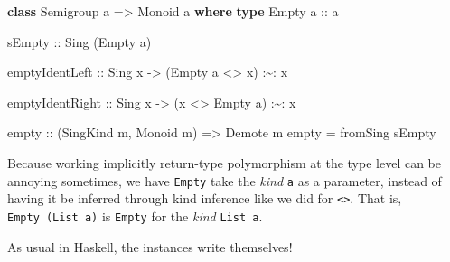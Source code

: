 \documentclass[]{article}
\newenvironment{Shaded}{}{}
\newcommand{\DataTypeTok}[1]{\textcolor[rgb]{0.56,0.13,0.00}{#1}}
\newcommand{\KeywordTok}[1]{\textcolor[rgb]{0.00,0.44,0.13}{\textbf{#1}}}
\newcommand{\NormalTok}[1]{#1}
\newcommand{\OperatorTok}[1]{\textcolor[rgb]{0.40,0.40,0.40}{#1}}
\newcommand{\OtherTok}[1]{\textcolor[rgb]{0.00,0.44,0.13}{#1}}
\begin{document}
\begin{Shaded}
\begin{Highlighting}[]
\KeywordTok{class} \DataTypeTok{Semigroup}\NormalTok{ a }\OtherTok{=\textgreater{}} \DataTypeTok{Monoid}\NormalTok{ a }\KeywordTok{where}
    \KeywordTok{type} \DataTypeTok{Empty}\OtherTok{ a ::}\NormalTok{ a}

\OtherTok{    sEmpty ::} \DataTypeTok{Sing}\NormalTok{ (}\DataTypeTok{Empty}\NormalTok{ a)}

\NormalTok{    emptyIdentLeft}
\OtherTok{        ::} \DataTypeTok{Sing}\NormalTok{ x}
        \OtherTok{{-}\textgreater{}}\NormalTok{ (}\DataTypeTok{Empty}\NormalTok{ a }\OperatorTok{\textless{}\textgreater{}}\NormalTok{ x) }\OperatorTok{:\textasciitilde{}:}\NormalTok{ x}

\NormalTok{    emptyIdentRight}
\OtherTok{        ::} \DataTypeTok{Sing}\NormalTok{ x}
        \OtherTok{{-}\textgreater{}}\NormalTok{ (x }\OperatorTok{\textless{}\textgreater{}} \DataTypeTok{Empty}\NormalTok{ a) }\OperatorTok{:\textasciitilde{}:}\NormalTok{ x}

\NormalTok{empty}
\OtherTok{    ::}\NormalTok{ (}\DataTypeTok{SingKind}\NormalTok{ m, }\DataTypeTok{Monoid}\NormalTok{ m)}
    \OtherTok{=\textgreater{}} \DataTypeTok{Demote}\NormalTok{ m}
\NormalTok{empty }\OtherTok{=}\NormalTok{ fromSing sEmpty}
\end{Highlighting}
\end{Shaded}

Because working implicitly return-type polymorphism at the type level can be
annoying sometimes, we have \texttt{Empty} take the \emph{kind} \texttt{a} as a
parameter, instead of having it be inferred through kind inference like we did
for \texttt{\textless{}\textgreater{}}. That is, \texttt{Empty\ (List\ a)} is
\texttt{Empty} for the \emph{kind} \texttt{List\ a}.

As usual in Haskell, the instances write themselves!
\end{document}
